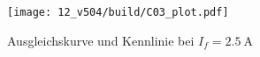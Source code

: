 \begin{figure}
    \centering
    \texttt{[image: 12\_v504/build/C03\_plot.pdf]}
    \caption{Ausgleichskurve und Kennlinie bei $I_f = \qty{2.5}{\ampere}$}
    \label{fig:c03}
\end{figure}